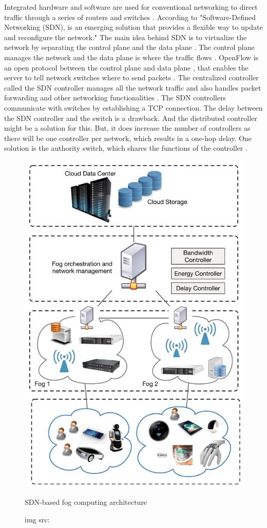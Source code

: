 Integrated hardware and software are used for conventional networking to direct traffic through a series of routers and switches \cite{yt}. According to \cite{mukherjee2018survey} "Software-Defined Networking (SDN), is an emerging solution that provides a flexible way to update and reconfigure the network." The main idea behind SDN is to virtualize the network \cite{yt} by separating the control plane and the data plane \cite{mukherjee2018survey}. The control plane manages the network and the data plane is where the traffic flows \cite{yt}. OpenFlow is an open protocol between the control plane and data plane \cite{mukherjee2018survey}, that enables the server to tell network switches where to send packets \cite{marg}. The centralized controller called the SDN controller \cite{mukherjee2018survey} manages all the network traffic \cite{yt} and also handles packet forwarding and other networking functionalities \cite{mukherjee2018survey}. The SDN controllers communicate with switches by establishing a TCP connection. The delay between the SDN controller and the switch is a drawback. And the distributed controller might be a solution for this. But, it does increase the number of controllers as there will be one controller per network, which results in a one-hop delay. One solution is the authority switch, which shares the functions of the controller \cite{mukherjee2018survey}. \par

\begin{figure}[H]
    \centering
    \includegraphics[width=.5\linewidth]{image/SDN-based fog computing architecture.png}
    \caption{SDN-based fog computing architecture}
    \caption*{img src: \cite{mukherjee2018survey}}
    \label{fig:sdn-based fog computing architecture}
\end{figure}

